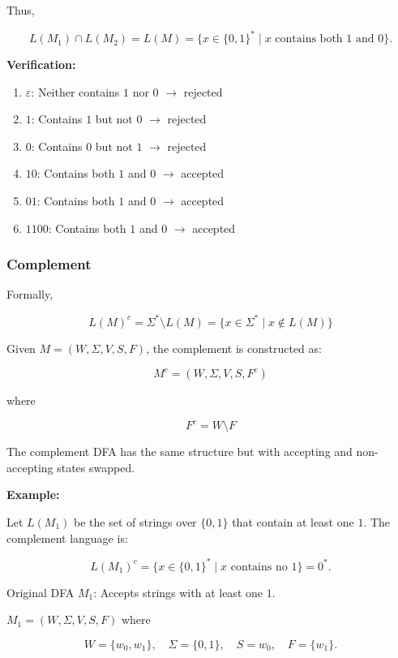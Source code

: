 \documentclass[12pt,a4paper,openany]{article}
\begin{document}
Thus,

\[
L(M_1) \cap L(M_2) = L(M) = \{x \in \{0,1\}^* \mid x \text{ contains both } 1 \text{ and } 0\}.
\]

\textbf{Verification:}

\begin{enumerate}
    \item $\varepsilon$: Neither contains $1$ nor $0$ $\to$ rejected 
    \item $1$: Contains $1$ but not $0$ $\to$ rejected 
    \item $0$: Contains $0$ but not $1$ $\to$ rejected 
    \item $10$: Contains both $1$ and $0$ $\to$ accepted 
    \item $01$: Contains both $1$ and $0$ $\to$ accepted 
    \item $1100$: Contains both $1$ and $0$ $\to$ accepted 
\end{enumerate}

\subsubsection{Complement}

Formally,

\[L(M)^c = \Sigma^* \setminus L(M) = \{x \in \Sigma^* \mid x \notin L(M)\}\]

Given $M = (W, \Sigma, V, S, F)$, the complement is constructed as:

\[M^c = (W, \Sigma, V, S, F^c)\]

where

\[F^c = W \setminus F\]

The complement DFA has the same structure but with accepting and non-accepting states swapped.

\textbf{Example:}

Let $L(M_1)$ be the set of strings over $\{0,1\}$ that contain at least one $1$.
The complement language is:

\[
L(M_1)^c = \{ x \in \{0,1\}^* \mid x \text{ contains no } 1 \}
        = 0^*.
\]


Original DFA $M_1$: Accepts strings with at least one $1$.

$M_1 = (W,\Sigma,V,S,F)$ where

\[
W = \{w_0,w_1\}, \quad
\Sigma = \{0,1\}, \quad
S = w_0, \quad
F = \{w_1\}.
\]

\begin{center}
\end{center}
\end{document}
